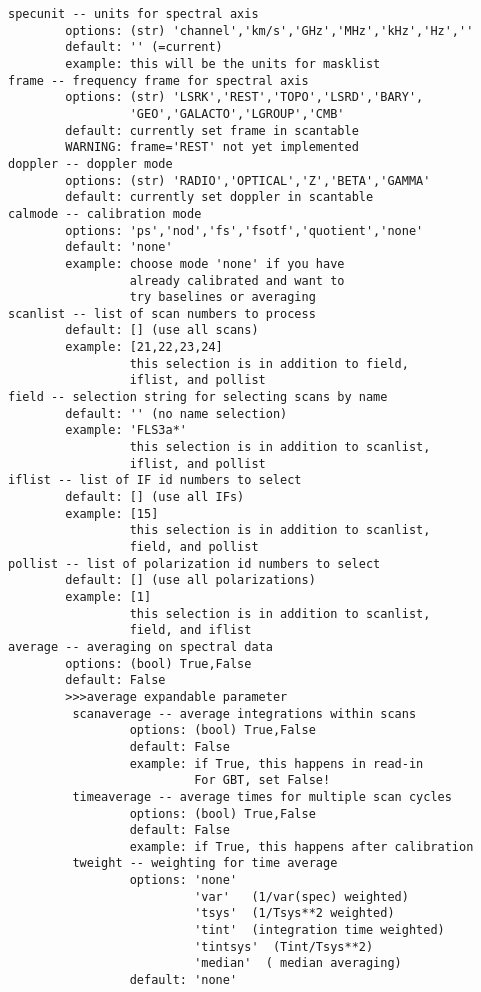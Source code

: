 \begin{verbatim}
specunit -- units for spectral axis
        options: (str) 'channel','km/s','GHz','MHz','kHz','Hz',''
        default: '' (=current)
        example: this will be the units for masklist
frame -- frequency frame for spectral axis
        options: (str) 'LSRK','REST','TOPO','LSRD','BARY',
                 'GEO','GALACTO','LGROUP','CMB'
        default: currently set frame in scantable
        WARNING: frame='REST' not yet implemented
doppler -- doppler mode
        options: (str) 'RADIO','OPTICAL','Z','BETA','GAMMA'
        default: currently set doppler in scantable
calmode -- calibration mode
        options: 'ps','nod','fs','fsotf','quotient','none'
        default: 'none'
        example: choose mode 'none' if you have
                 already calibrated and want to
                 try baselines or averaging
scanlist -- list of scan numbers to process
        default: [] (use all scans)
        example: [21,22,23,24]
                 this selection is in addition to field,
                 iflist, and pollist
field -- selection string for selecting scans by name
        default: '' (no name selection)
        example: 'FLS3a*'
                 this selection is in addition to scanlist,
                 iflist, and pollist
iflist -- list of IF id numbers to select
        default: [] (use all IFs)
        example: [15]
                 this selection is in addition to scanlist,
                 field, and pollist
pollist -- list of polarization id numbers to select
        default: [] (use all polarizations)
        example: [1]
                 this selection is in addition to scanlist,
                 field, and iflist
average -- averaging on spectral data
        options: (bool) True,False
        default: False
        >>>average expandable parameter
         scanaverage -- average integrations within scans
                 options: (bool) True,False
                 default: False
                 example: if True, this happens in read-in
                          For GBT, set False!
         timeaverage -- average times for multiple scan cycles
                 options: (bool) True,False
                 default: False
                 example: if True, this happens after calibration
         tweight -- weighting for time average
                 options: 'none'
                          'var'   (1/var(spec) weighted)
                          'tsys'  (1/Tsys**2 weighted)
                          'tint'  (integration time weighted)
                          'tintsys'  (Tint/Tsys**2)
                          'median'  ( median averaging)
                 default: 'none'

\end{verbatim}
